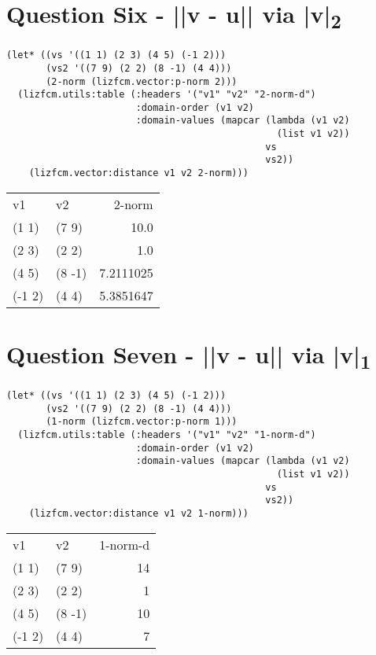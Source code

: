 \documentclass[11pt]{article}
\begin{document}
\section{Question Six - ||v - u|| via |v|\textsubscript{2}}
\label{sec:orga2324b2}
\begin{verbatim}
(let* ((vs '((1 1) (2 3) (4 5) (-1 2)))
       (vs2 '((7 9) (2 2) (8 -1) (4 4)))
       (2-norm (lizfcm.vector:p-norm 2)))
  (lizfcm.utils:table (:headers '("v1" "v2" "2-norm-d")
                       :domain-order (v1 v2)
                       :domain-values (mapcar (lambda (v1 v2)
                                                (list v1 v2))
                                              vs
                                              vs2))
    (lizfcm.vector:distance v1 v2 2-norm)))
\end{verbatim}


\begin{center}
\begin{tabular}{llr}
v1 & v2 & 2-norm\\[0pt]
(1 1) & (7 9) & 10.0\\[0pt]
(2 3) & (2 2) & 1.0\\[0pt]
(4 5) & (8 -1) & 7.2111025\\[0pt]
(-1 2) & (4 4) & 5.3851647\\[0pt]
\end{tabular}
\end{center}

\section{Question Seven - ||v - u|| via |v|\textsubscript{1}}
\label{sec:org388fbc7}
\begin{verbatim}
(let* ((vs '((1 1) (2 3) (4 5) (-1 2)))
       (vs2 '((7 9) (2 2) (8 -1) (4 4)))
       (1-norm (lizfcm.vector:p-norm 1)))
  (lizfcm.utils:table (:headers '("v1" "v2" "1-norm-d")
                       :domain-order (v1 v2)
                       :domain-values (mapcar (lambda (v1 v2)
                                                (list v1 v2))
                                              vs
                                              vs2))
    (lizfcm.vector:distance v1 v2 1-norm)))
\end{verbatim}


\begin{center}
\begin{tabular}{llr}
v1 & v2 & 1-norm-d\\[0pt]
(1 1) & (7 9) & 14\\[0pt]
(2 3) & (2 2) & 1\\[0pt]
(4 5) & (8 -1) & 10\\[0pt]
(-1 2) & (4 4) & 7\\[0pt]
\end{tabular}
\end{center}
\end{document}
